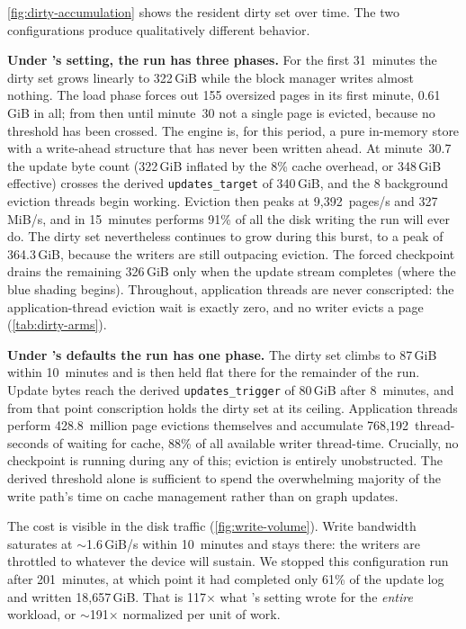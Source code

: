 \autoref{fig:dirty-accumulation} shows the resident dirty set over time. 
The two configurations produce qualitatively different behavior.

\textbf{Under \project{}'s setting, the run has three phases.} For the first
31~minutes the dirty set grows linearly to 322\,GiB while the block manager writes almost nothing.
The load phase forces out 155 oversized pages in its first minute, 0.61\,GiB in all; from then until minute~30 not a single page is evicted, because no threshold has been crossed.
The engine is, for this period, a pure in-memory store with a write-ahead structure that has never been written ahead.
At minute~30.7 the update byte count (322\,GiB inflated by the 8\% cache overhead, or 348\,GiB effective) crosses the derived \texttt{updates\_target} of 340\,GiB, and the 8 background eviction threads begin working.
Eviction then peaks at 9{,}392~pages/s and 327\,MiB/s, and in 15~minutes performs 91\% of all the disk writing the run will ever do.
The dirty set nevertheless continues to grow during this burst, to a peak of 364.3\,GiB, because the writers are still outpacing eviction.
The forced checkpoint drains the remaining 326\,GiB only when the update stream completes (where the blue shading begins).
Throughout, application threads are never conscripted: the application-thread eviction wait is exactly zero, and no writer evicts a page (\autoref{tab:dirty-arms}).

\textbf{Under \wt{}'s defaults the run has one phase.} The dirty set climbs to 87\,GiB within 10~minutes and is then held flat there for the remainder of the run.
Update bytes reach the derived \texttt{updates\_trigger} of 80\,GiB after 8~minutes, and from that point conscription holds the dirty set at its ceiling.
Application threads perform 428.8~million page evictions themselves and accumulate 768{,}192~thread-seconds of waiting for cache, 88\% of all available writer thread-time.
Crucially, no checkpoint is running during any of this; eviction is entirely unobstructed.
The derived threshold alone is sufficient to spend the overwhelming majority of the write path's time on cache management rather than on graph updates.

The cost is visible in the disk traffic (\autoref{fig:write-volume}).
Write bandwidth saturates at ${\sim}$1.6\,GiB/s within 10~minutes and stays there: the writers are throttled to whatever the device will sustain. 
We stopped this configuration run after 201~minutes, at which point it had completed only 61\% of the update log and written 18{,}657\,GiB.
That is 117$\times$ what \project{}'s setting wrote for the \emph{entire} workload, or ${\sim}$191$\times$ normalized per unit of work.

